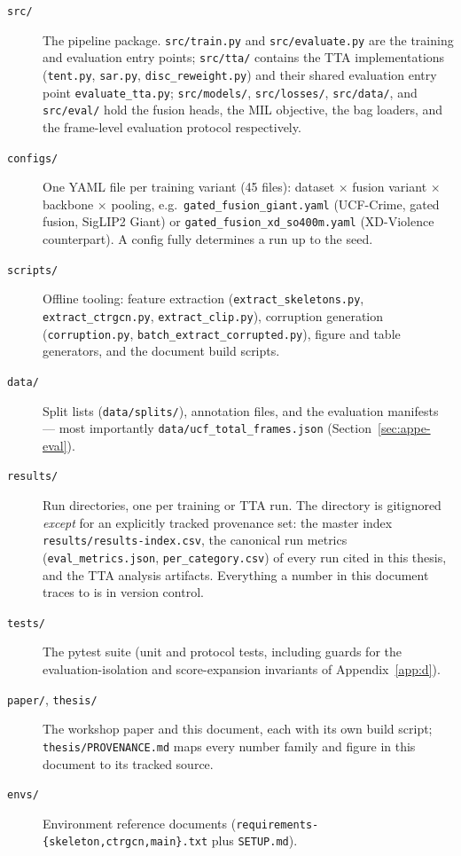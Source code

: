 \begingroup\sloppy
\begin{description}
    \item[\texttt{src/}] The pipeline package. \texttt{src/train.py} and
    \texttt{src/evaluate.py} are the training and evaluation entry points;
    \texttt{src/tta/} contains the TTA implementations
    (\texttt{tent.py}, \texttt{sar.py}, \texttt{disc\_reweight.py}) and their
    shared evaluation entry point \texttt{evaluate\_tta.py};
    \texttt{src/models/}, \texttt{src/losses/}, \texttt{src/data/}, and
    \texttt{src/eval/} hold the fusion heads, the MIL objective, the bag
    loaders, and the frame-level evaluation protocol respectively.
    \item[\texttt{configs/}] One YAML file per training variant (45 files):
    dataset $\times$ fusion variant $\times$ backbone $\times$ pooling, e.g.\
    \texttt{gated\_fusion\_giant.yaml} (UCF-Crime, gated fusion, SigLIP2
    Giant) or \texttt{gated\_fusion\_xd\_so400m.yaml} (XD-Violence
    counterpart). A config fully determines a run up to the seed.
    \item[\texttt{scripts/}] Offline tooling: feature extraction
    (\texttt{extract\_skeletons.py}, \texttt{extract\_ctrgcn.py},
    \texttt{extract\_clip.py}), corruption generation
    (\texttt{corruption.py}, \texttt{batch\_extract\_corrupted.py}), figure
    and table generators, and the document build scripts.
    \item[\texttt{data/}] Split lists (\texttt{data/splits/}), annotation
    files, and the evaluation manifests --- most importantly
    \texttt{data/ucf\_total\_frames.json} (Section~\ref{sec:appe-eval}).
    \item[\texttt{results/}] Run directories, one per training or TTA run.
    The directory is gitignored \emph{except} for an explicitly tracked
    provenance set: the master index \texttt{results/results-index.csv}, the
    canonical run metrics (\texttt{eval\_metrics.json},
    \texttt{per\_category.csv}) of every run cited in this thesis, and the
    TTA analysis artifacts. Everything a number in this document traces to is
    in version control.
    \item[\texttt{tests/}] The pytest suite (unit and protocol tests,
    including guards for the evaluation-isolation and score-expansion
    invariants of Appendix~\ref{app:d}).
    \item[\texttt{paper/}, \texttt{thesis/}] The workshop paper and this
    document, each with its own build script;
    \texttt{thesis/PROVENANCE.md} maps every number family and figure in
    this document to its tracked source.
    \item[\texttt{envs/}] Environment reference documents
    (\texttt{requirements-\allowbreak\{skeleton,\allowbreak ctrgcn,\allowbreak main\}.txt}
    plus \texttt{SETUP.md}).
\end{description}
\endgroup


